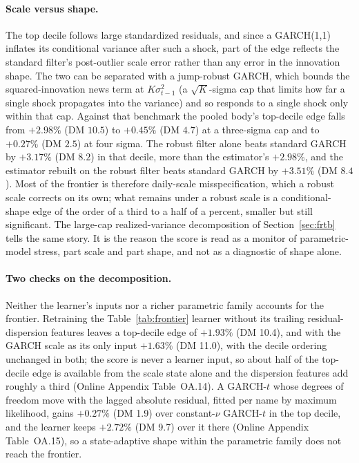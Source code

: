 \documentclass[11pt]{article}
\theoremstyle{remark}
\begin{document}
\paragraph{Scale versus shape.} The top decile follows large
standardized residuals, and since a GARCH(1,1) inflates its conditional
variance after such a shock, part of the edge reflects the standard
filter's post-outlier scale error rather than any error in the
innovation shape. The two can be separated with a jump-robust GARCH,
which bounds the squared-innovation news term at $K\sigma_{t-1}^2$ (a
$\sqrt{K}$-sigma cap that limits how far a single shock propagates into the
variance) and so responds to a single shock only within that cap. Against that benchmark the pooled body's top-decile
edge falls from $+2.98\%$ (DM $10.5$) to $+0.45\%$ (DM $4.7$) at a
three-sigma cap and to $+0.27\%$ (DM $2.5$) at four sigma. The robust
filter alone beats standard GARCH by $+3.17\%$ (DM $8.2$) in that decile,
more than the estimator's $+2.98\%$, and the estimator rebuilt on the
robust filter beats standard GARCH by $+3.51\%$ (DM $8.4$). Most of the frontier is therefore
daily-scale misspecification, which a robust scale corrects on its own;
what remains under a robust scale is a conditional-shape edge of the order
of a third to a half of a percent, smaller but still significant. The
large-cap realized-variance decomposition of Section~\ref{sec:frtb}
tells the same story. It is the reason the score is read as a monitor of
parametric-model stress, part scale and part shape, and not as a
diagnostic of shape alone.

\paragraph{Two checks on the decomposition.} Neither the learner's inputs
nor a richer parametric family accounts for the frontier. Retraining the
Table~\ref{tab:frontier} learner without its trailing residual-dispersion
features leaves a top-decile edge of $+1.93\%$ (DM 10.4), and with the
GARCH scale as its only input $+1.63\%$ (DM 11.0), with the decile
ordering unchanged in both; the score is never a learner input, so about
half of the top-decile edge is available from the scale state alone and
the dispersion features add roughly a third (Online Appendix
Table~OA.14). A GARCH-$t$ whose degrees of freedom move with the lagged
absolute residual, fitted per name by maximum likelihood, gains $+0.27\%$
(DM 1.9) over constant-$\nu$ GARCH-$t$ in the top decile, and the
learner keeps $+2.72\%$ (DM 9.7) over it there (Online Appendix
Table~OA.15), so a state-adaptive shape within the parametric family does
not reach the frontier.
\end{document}
